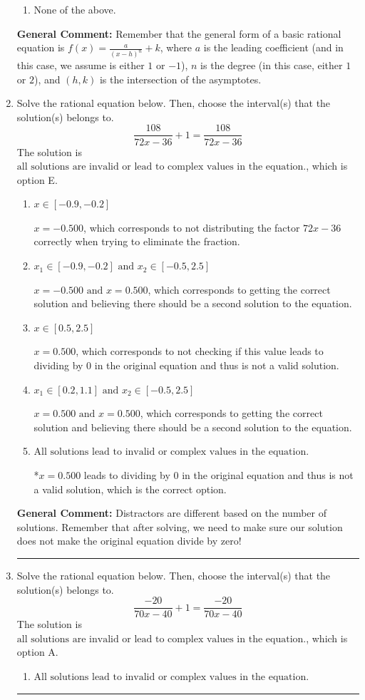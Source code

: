 \documentclass{extbook}[14pt]
\newcommand{\litem}[1]{\item #1

\rule{\textwidth}{0.4pt}}
\begin{document}
\begin{enumerate}
{\begin{enumerate}[label=\Alph*.]
\begin{multicols}{2}
\end{multicols}\item None of the above.\end{enumerate}
\textbf{General Comment:} Remember that the general form of a basic rational equation is $ f(x) = \frac{a}{(x-h)^n} + k$, where $a$ is the leading coefficient (and in this case, we assume is either $1$ or $-1$), $n$ is the degree (in this case, either $1$ or $2$), and $(h, k)$ is the intersection of the asymptotes.
}
\litem{
Solve the rational equation below. Then, choose the interval(s) that the solution(s) belongs to.
\[ \frac{108}{72x -36} + 1 = \frac{108}{72x -36} \]The solution is \( \text{all solutions are invalid or lead to complex values in the equation.} \), which is option E.\begin{enumerate}[label=\Alph*.]
\item \( x \in [-0.9,-0.2] \)

$x = -0.500$, which corresponds to not distributing the factor $72x -36$ correctly when trying to eliminate the fraction.
\item \( x_1 \in [-0.9, -0.2] \text{ and } x_2 \in [-0.5,2.5] \)

$x = -0.500 \text{ and } x = 0.500$, which corresponds to getting the correct solution and believing there should be a second solution to the equation.
\item \( x \in [0.5,2.5] \)

$x = 0.500$, which corresponds to not checking if this value leads to dividing by 0 in the original equation and thus is not a valid solution.
\item \( x_1 \in [0.2, 1.1] \text{ and } x_2 \in [-0.5,2.5] \)

$x = 0.500 \text{ and } x = 0.500$, which corresponds to getting the correct solution and believing there should be a second solution to the equation.
\item \( \text{All solutions lead to invalid or complex values in the equation.} \)

*$x = 0.500$ leads to dividing by 0 in the original equation and thus is not a valid solution, which is the correct option.
\end{enumerate}

\textbf{General Comment:} Distractors are different based on the number of solutions. Remember that after solving, we need to make sure our solution does not make the original equation divide by zero!
}
\litem{
Solve the rational equation below. Then, choose the interval(s) that the solution(s) belongs to.
\[ \frac{-20}{70x -40} + 1 = \frac{-20}{70x -40} \]The solution is \( \text{all solutions are invalid or lead to complex values in the equation.} \), which is option A.\begin{enumerate}[label=\Alph*.]
\item \( \text{All solutions lead to invalid or complex values in the equation.} \)


\end{enumerate}}
\end{enumerate}
\end{document}
